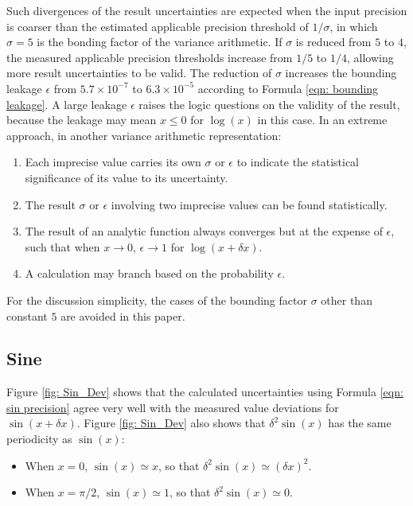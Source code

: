 \documentclass[twoside]{article}
\numberwithin{equation}{section}
\begin{document}
Such divergences of the result uncertainties are expected when the input precision is coarser than the estimated applicable precision threshold of $1/\sigma$, in which $\sigma=5$ is the bonding factor of the variance arithmetic.
If $\sigma$ is reduced from $5$ to $4$, the measured applicable precision thresholds increase from $1/5$ to $1/4$, allowing more result uncertainties to be valid.
The reduction of $\sigma$ increases the bounding leakage $\epsilon$ from $5.7 \times 10^{-7}$ to $6.3 \times 10^{-5}$ according to Formula \eqref{eqn: bounding leakage}.
A large leakage $\epsilon$ raises the logic questions on the validity of the result, because the leakage may mean $x \leq 0$ for $\log(x)$ in this case.
In an extreme approach, in another variance arithmetic representation:
\begin{enumerate}

\item Each imprecise value carries its own $\sigma$ or $\epsilon$ to indicate the statistical significance of its value to its uncertainty.

\item The result $\sigma$ or $\epsilon$ involving two imprecise values can be found statistically.

\item The result of an analytic function always converges but at the expense of $\epsilon$, such that  when $x \rightarrow 0$, $\epsilon \rightarrow 1$ for $\log(x + \delta x)$. 

\item A calculation may branch based on the probability $\epsilon$.

\end{enumerate}
For the discussion simplicity, the cases of the bounding factor $\sigma$ other than constant $5$ are avoided in this paper.




\subsection{Sine}

Figure \ref{fig: Sin_Dev} shows that the calculated uncertainties using Formula \eqref{eqn: sin precision} agree very well with the measured value deviations for $\sin(x + \delta x)$.
Figure \ref{fig: Sin_Dev} also shows that $\delta^2 \sin(x)$ has the same periodicity as $\sin(x)$:
\begin{itemize}
\item When $x=0$, $\sin(x) \simeq x$, so that $\delta^2 \sin(x) \simeq (\delta x)^2$.
\item When $x=\pi/2$, $\sin(x) \simeq 1$, so that $\delta^2 \sin(x) \simeq 0$.
\end{itemize}
\end{document}
